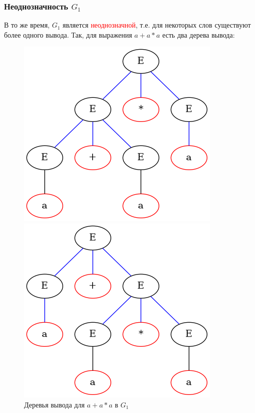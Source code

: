 \documentclass{beamer}
\begin{document}
	\begin{frame}
    \frametitle{Неоднозначность $G_1$}
        В то же время, $G_1$ является \textcolor{red}{неоднозначной}, т.е. для некоторых слов существуют более одного вывода. Так, для выражения $a + a * a$ есть два дерева вывода:
        
        \begin{figure}[!tbp]
          \centering
          \begin{minipage}[b]{0.4\textwidth}
            \includegraphics[width=\textwidth]{g1_ex1.png}
          \end{minipage}
          \hfill
          \begin{minipage}[b]{0.4\textwidth}
            \includegraphics[width=\textwidth]{g1_ex2.png}
          \end{minipage}
          \caption{Деревья вывода для $a+a*a$ в $G_1$}
        \end{figure}
	\end{frame}
	
\end{document}
